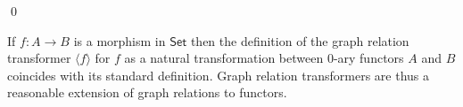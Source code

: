 \documentclass{lmcs}
\theoremstyle{plain}\newtheorem{satz}[thm]{Satz}
\newcommand{\set}{\mathsf{Set}}
\renewcommand{\id}{\mathit{id}}
\begin{document}
{\begin{comment}

Finally, by the left-lifting property of $q_{F^\wedge\overline{R}}$
      with respect to $\iota_{F^\wedge\overline{S}}$ given by the mono-epi
      factorization system, there exists an $\epsilon$ such that the
      following diagram commutes:
      {\footnotesize
        \[
      \begin{tikzcd}
          F\overline{R}
          \ar[d, "{F\overline{\gamma}}"']
          \ar[r, twoheadrightarrow, "{q_{\alpha^\wedge\overline{R}}}"]
          &\alpha^\wedge\overline{R}
          \ar[d, dashed, "{\epsilon}"]
          \ar[r, hookrightarrow, "{\iota_{\alpha^\wedge\overline{R}}}"]
          &F\overline{A} \times G\overline{B}
          \ar[d, "{F\overline{\beta} \times G\overline{\beta'}}"] \\
          F\overline{S}
          \ar[r, twoheadrightarrow, "{q_{\alpha^\wedge\overline{S}}}"']
          &\alpha^\wedge\overline{S}
          \ar[r, hookrightarrow, "{\iota_{\alpha^\wedge\overline{S}}}"']
          &F\overline{C} \times G\overline{D}
      \end{tikzcd}
      \]}

      \vspace*{-0.1in}
\end{comment}
\qed

\vspace*{0.1in}

If $f : A \to B$ is a morphism in $\set$ then the definition of the
graph relation transformer $\langle f \rangle$ for $f$ as a natural
transformation between $0$-ary functors $A$ and $B$ coincides with its
standard definition.  Graph relation transformers are thus a
reasonable extension of graph relations to functors.
\begin{comment}

\vspace*{0.2in}
  
If $f : A \to B$ is a function with graph relation $\graph{f} = (A, B,
\graph{f}^*)$, then $\langle \id_{A}, f \rangle : A \to A \times B$
and $\langle \id_{A}, f \rangle\, A = \graph{f}^*$.  Moreover, if
$\iota_{\graph{f}} : \graph{f}^* \hookrightarrow A \times B$ is the
inclusion of $\graph{f}^*$ into $A \times B$ then there is an
isomorphism of subobjects
\[\begin{tikzcd}
A \ar[rr, "{\cong}"] \ar[dr, "{\langle \id_{A}, f \rangle}"']
&&{\graph{f}^*} \ar[dl, "{\iota_{\graph{f}}}"]\\
&A \times B
\end{tikzcd}\]


\end{comment}}
\end{document}
